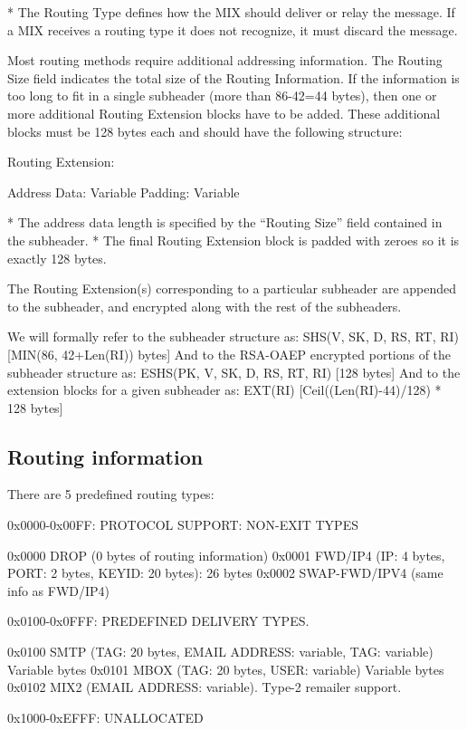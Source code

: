 * The Routing Type defines how the MIX should deliver or relay the
  message. If a MIX receives a routing type it does not recognize,
  it must discard the message.

  Most routing methods require additional addressing information.
  The Routing Size field indicates the total size of the Routing
  Information. If the information is too long to fit in a single
  subheader (more than 86-42=44 bytes), then one or more additional
  Routing Extension blocks have to be added. These additional blocks
  must be 128 bytes each and should have the following structure:
 
  Routing Extension:

    Address Data:     Variable
    Padding:          Variable

* The address data length is specified by the ``Routing Size'' field
  contained in the subheader.
* The final Routing Extension block is padded with zeroes so it is
  exactly 128 bytes.

The Routing Extension(s) corresponding to a particular subheader are
appended to the subheader, and encrypted along with the rest of the
subheaders.

We will formally refer to the subheader structure as:
SHS(V, SK, D, RS, RT, RI)     [MIN(86, 42+Len(RI)) bytes] 
And to the RSA-OAEP encrypted portions of the subheader structure as:
ESHS(PK, V, SK, D, RS, RT, RI)   [128 bytes]
And to the extension blocks for a given subheader as:
EXT(RI)                       [Ceil((Len(RI)-44)/128) * 128 bytes]

\subsection{Routing information}

There are 5 predefined routing types:

0x0000-0x00FF: PROTOCOL SUPPORT: NON-EXIT TYPES

0x0000 DROP    (0 bytes of routing information)
0x0001 FWD/IP4 (IP: 4 bytes, PORT: 2 bytes, KEYID: 20 bytes): 26 bytes
0x0002 SWAP-FWD/IPV4 (same info as FWD/IP4)

0x0100-0x0FFF: PREDEFINED DELIVERY TYPES.

0x0100 SMTP   (TAG: 20 bytes, EMAIL ADDRESS: variable, TAG: variable) Variable bytes
0x0101 MBOX   (TAG: 20 bytes, USER: variable) Variable bytes
0x0102 MIX2   (EMAIL ADDRESS: variable).  Type-2 remailer support.

0x1000-0xEFFF: UNALLOCATED


